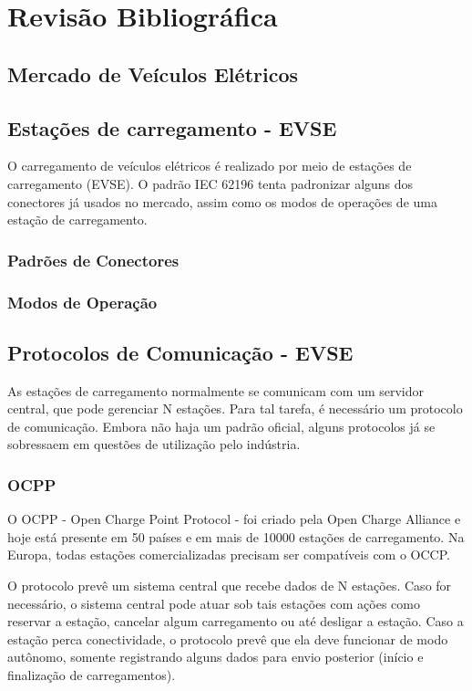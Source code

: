 \chapter{Revisão Bibliográfica}

\section{Mercado de Veículos Elétricos}

\section{Estações de carregamento - EVSE}

O carregamento de veículos elétricos é realizado por meio de estações de carregamento (EVSE). O padrão IEC 62196 \cite{iec62196} tenta padronizar alguns dos conectores já usados no mercado, assim como os modos de operações de uma estação de carregamento.

\subsection{Padrões de Conectores}

\subsection{Modos de Operação}

\section{Protocolos de Comunicação - EVSE}

As estações de carregamento normalmente se comunicam com um servidor central, que pode gerenciar N estações. Para tal tarefa, é necessário um protocolo de comunicação. Embora não haja um padrão oficial, alguns protocolos já se sobressaem em questões de utilização pelo indústria.

\subsection{OCPP}

O OCPP - Open Charge Point Protocol - foi criado pela Open Charge Alliance e hoje está presente em 50 países e em mais de 10000 estações de carregamento. Na Europa, todas estações comercializadas precisam ser compatíveis com o OCCP.

O protocolo prevê um sistema central que recebe dados de N estações. Caso for necessário, o sistema central pode atuar sob tais estações com ações como reservar a estação, cancelar algum carregamento ou até desligar a estação. Caso a estação perca conectividade, o protocolo prevê que ela deve funcionar de modo autônomo, somente registrando alguns dados para envio posterior (início e finalização de carregamentos).

